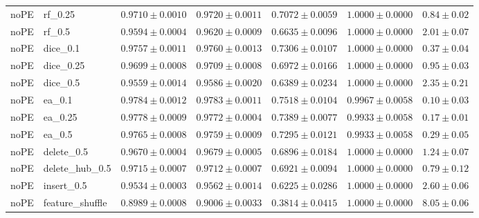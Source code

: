 \documentclass[UTF8,a4paper,11pt,fontset=fandol]{ctexart}
\begin{document}
{\begin{longtable}{llrrrrr}
noPE & rf\_0.25 & $0.9710\pm0.0010$ & $0.9720\pm0.0011$ & $0.7072\pm0.0059$ & $1.0000\pm0.0000$ & $0.84\pm0.02$ \\
noPE & rf\_0.5 & $0.9594\pm0.0004$ & $0.9620\pm0.0009$ & $0.6635\pm0.0096$ & $1.0000\pm0.0000$ & $2.01\pm0.07$ \\
noPE & dice\_0.1 & $0.9757\pm0.0011$ & $0.9760\pm0.0013$ & $0.7306\pm0.0107$ & $1.0000\pm0.0000$ & $0.37\pm0.04$ \\
noPE & dice\_0.25 & $0.9699\pm0.0008$ & $0.9709\pm0.0008$ & $0.6972\pm0.0166$ & $1.0000\pm0.0000$ & $0.95\pm0.03$ \\
noPE & dice\_0.5 & $0.9559\pm0.0014$ & $0.9586\pm0.0020$ & $0.6389\pm0.0234$ & $1.0000\pm0.0000$ & $2.35\pm0.21$ \\
noPE & ea\_0.1 & $0.9784\pm0.0012$ & $0.9783\pm0.0011$ & $0.7518\pm0.0104$ & $0.9967\pm0.0058$ & $0.10\pm0.03$ \\
noPE & ea\_0.25 & $0.9778\pm0.0009$ & $0.9772\pm0.0004$ & $0.7389\pm0.0077$ & $0.9933\pm0.0058$ & $0.17\pm0.01$ \\
noPE & ea\_0.5 & $0.9765\pm0.0008$ & $0.9759\pm0.0009$ & $0.7295\pm0.0121$ & $0.9933\pm0.0058$ & $0.29\pm0.05$ \\
noPE & delete\_0.5 & $0.9670\pm0.0004$ & $0.9679\pm0.0005$ & $0.6896\pm0.0184$ & $1.0000\pm0.0000$ & $1.24\pm0.07$ \\
noPE & delete\_hub\_0.5 & $0.9715\pm0.0007$ & $0.9712\pm0.0007$ & $0.6921\pm0.0094$ & $1.0000\pm0.0000$ & $0.79\pm0.12$ \\
noPE & insert\_0.5 & $0.9534\pm0.0003$ & $0.9562\pm0.0014$ & $0.6225\pm0.0286$ & $1.0000\pm0.0000$ & $2.60\pm0.06$ \\
noPE & feature\_shuffle & $0.8989\pm0.0008$ & $0.9006\pm0.0033$ & $0.3814\pm0.0415$ & $1.0000\pm0.0000$ & $8.05\pm0.06$ \\
\end{longtable}
}
\end{document}
